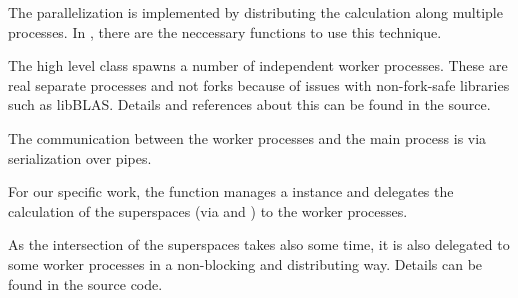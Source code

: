 The parallelization is implemented by distributing the calculation along multiple processes. In , there are the neccessary functions to use this technique.

The high level class  spawns a number of independent worker processes. These are real separate processes and not forks because of issues with non-fork-safe libraries such as libBLAS. Details and references about this can be found in the source.

The communication between the worker processes and the main process is via serialization over pipes.

For our specific work, the function  manages a  instance and delegates the calculation of the superspaces (via  and ) to the worker processes.

As the intersection of the superspaces takes also some time, it is also delegated to some worker processes in a non-blocking and distributing way. Details can be found in the source code.

